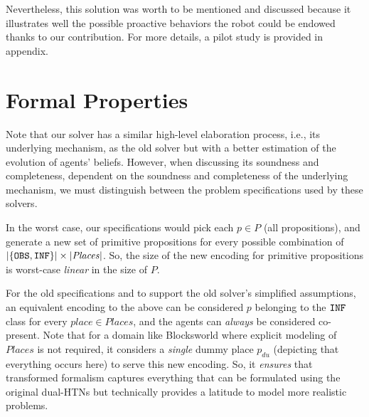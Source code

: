 \documentclass[letterpaper]{article} %
\begin{document}
Nevertheless, this solution was worth to be mentioned and discussed because it illustrates well the possible proactive behaviors the robot could be endowed thanks to our contribution. For more details, a pilot study is provided in appendix.




\section{Formal Properties}
Note that our solver has a similar high-level elaboration process, i.e., its underlying mechanism, as the old solver but with a better estimation of the evolution of agents' beliefs.  
However, when discussing its soundness and completeness, dependent on the soundness and completeness of the underlying mechanism, we must distinguish between the problem specifications used by these solvers. 

In the worst case, our specifications would pick each $p \in P$ (all propositions), and generate a new set of primitive propositions for every possible combination of $|\{\texttt{OBS},\texttt{INF}\}| \times |\mathit{Places}|$. 
So, the size of the new encoding for primitive propositions is worst-case \textit{linear} in the size of $P$.

For the old specifications and to support the old solver's simplified assumptions, an equivalent encoding to the above can be considered $p$ belonging to the $\texttt{INF}$ class for every $place \in \mathit{Places}$, and the agents can \textit{always} be considered co-present.  
Note that for a domain like Blocksworld where explicit modeling of $\mathit{Places}$ is not required, it considers a \textit{single} dummy place $p_{du}$ (depicting that everything occurs here) to serve this new encoding. So, it \textit{ensures} that transformed formalism captures everything that can be formulated using the original dual-HTNs but technically provides a latitude to model more realistic problems. 
\end{document}

